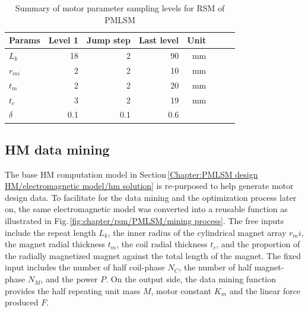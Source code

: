             
            \begin{table}[!h]
                \renewcommand{\arraystretch}{1.2}
                \caption{Summary of motor parameter sampling levels for \acs{RSM} of \acs{PMLSM}}
                \label{table:RSM design level for PMLSM}
                \centering
                \begin{tabular}{@{}l r r r r r r r@{}}
                \hline
                \bfseries Params & \bfseries Level 1 & \bfseries Jump step & \bfseries Last level & \bfseries Unit \\
                \hline
                    $L_k$       &   18     &   2     &   90     &   $\mathrm{mm}$\\
                    $r_{mi}$    &    2     &   2     &   10     &   $\mathrm{mm}$\\
                    $t_m$       &    2     &   2     &   20     &   $\mathrm{mm}$\\
                    $t_c$       &    3     &   2     &   19     &   $\mathrm{mm}$\\
                    $\delta$    &  0.1     & 0.1     &  0.6     &   \\
                \hline
                \end{tabular}
            \end{table}
        
        
        \subsection{\acs{HM} data mining}           \label{Chapter:RSM/PMLSM/data mining}
        
        
            The base \acs{HM} computation model in Section\,\ref{Chapter:PMLSM design HM/electromagnetic model/hm solution} is re-purposed to help generate motor design data. To facilitate for the data mining and the optimization process later on, the same electromagnetic model was converted into a reusable function as illustrated in Fig.\,\ref{fig:chapter/rsm/PMLSM/mining process}. The free inputs include the repeat length $L_k$, the inner radius of the cylindrical magnet array $r_mi$, the magnet radial thickness $t_m$, the coil radial thickness $t_c$, and the proportion of the radially magnetized magnet against the total length of the magnet. The fixed input includes the number of half coil-phase $N_C$, the number of half magnet-phase $N_M$, and the power $P$. On the output side, the data mining function provides the half repeating unit mass $M$, motor constant $K_m$ and the linear force produced $F$.
        
